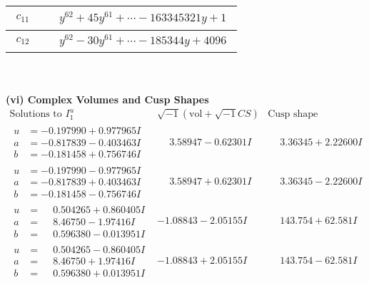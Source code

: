 \documentclass[1p]{elsarticle_modified}
\theoremstyle{definition}
\newcommand{\I}{\sqrt{-1}}
\begin{document}
\begin{tabular}{m{50pt}|m{274pt}}
\hline $$\begin{aligned}c_{11}\end{aligned}$$&$\begin{aligned}
&y^{62}+45 y^{61}+\cdots-163345321 y+1
\end{aligned}$\\
\hline $$\begin{aligned}c_{12}\end{aligned}$$&$\begin{aligned}
&y^{62}-30 y^{61}+\cdots-185344 y+4096
\end{aligned}$\\
\hline
\end{tabular}\\~\\
\newpage\flushleft \textbf{(vi) Complex Volumes and Cusp Shapes}
$$\begin{array}{c|c|c}  
\text{Solutions to }I^u_{1}& \I (\text{vol} + \sqrt{-1}CS) & \text{Cusp shape}\\
 \hline 
\begin{aligned}
u &= -0.197990 + 0.977965 I \\
a &= -0.817839 - 0.403463 I \\
b &= -0.181458 + 0.756746 I\end{aligned}
 & \phantom{-}3.58947 - 0.62301 I & \phantom{-}3.36345 + 2.22600 I \\ \hline\begin{aligned}
u &= -0.197990 - 0.977965 I \\
a &= -0.817839 + 0.403463 I \\
b &= -0.181458 - 0.756746 I\end{aligned}
 & \phantom{-}3.58947 + 0.62301 I & \phantom{-}3.36345 - 2.22600 I \\ \hline\begin{aligned}
u &= \phantom{-}0.504265 + 0.860405 I \\
a &= \phantom{-}8.46750 - 1.97416 I \\
b &= \phantom{-}0.596380 - 0.013951 I\end{aligned}
 & -1.08843 - 2.05155 I & \phantom{-}143.754 + 62.581 I \\ \hline\begin{aligned}
u &= \phantom{-}0.504265 - 0.860405 I \\
a &= \phantom{-}8.46750 + 1.97416 I \\
b &= \phantom{-}0.596380 + 0.013951 I\end{aligned}
 & -1.08843 + 2.05155 I & \phantom{-}143.754 - 62.581 I \\ \hline\begin{aligned}

\end{aligned}
\end{array}$$
\end{document}
